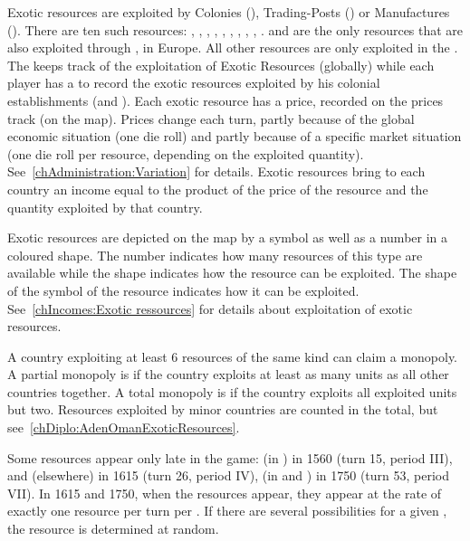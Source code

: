 \label{chThePowers:ResourcesExploitation}
\aparag[Resources] Exotic resources are exploited by Colonies (\COL),
Trading-Posts (\TP) or Manufactures (\MNU). There are ten such resources:
, , , , , , , , , .
\bparag {} and  are the only resources that are also
exploited through \MNU, in Europe. All other resources are only exploited in
the \ROTW.
\bparag The  keeps track of the
exploitation of Exotic Resources (globally) while each player has a
 to record the exotic resources exploited by his
colonial establishments (and \MNU).
\aparag Each exotic resource has a price, recorded on the prices track (on the
\ROTW map).
\bparag Prices change each turn, partly because of the global economic
situation (one die roll) and partly because of a specific market situation
(one die roll per resource, depending on the exploited
quantity). See~\ref{chAdministration:Variation} for details.
\bparag Exotic resources bring to each country an income equal to the product
of the price of the resource and the quantity exploited by that country.

\aparag Exotic resources are depicted on the \ROTW map by a symbol as well as
a number in a coloured shape. The number indicates how many resources of this
type are available while the shape indicates how the resource can be
exploited.
\bparag The shape of the symbol of the resource indicates how it can be
exploited. See~\ref{chIncomes:Exotic ressources} for details about
exploitation of exotic resources.

\label{chThePowers:MonopolyExoticResources}
A country exploiting at least 6 resources of the same kind can claim a
monopoly.
\bparag A partial monopoly is if the country exploits at least as many units
as all other countries together.
\bparag A total monopoly is if the country exploits all exploited units but
two.
\bparag Resources exploited by minor countries are counted in the total, but
see~\ref{chDiplo:AdenOmanExoticResources}.

\label{chThePowers:LateResources} Some
resources appear only late in the game:  (in ) in
1560 (turn 15, period III),  and 
(elsewhere) in 1615 (turn 26, period IV),  (in 
and ) in 1750 (turn 53, period VII).
\bparag In 1615 and 1750, when the resources appear, they appear at the rate
of exactly one resource per turn per \Area. If there are several possibilities
for a given \Area, the resource is determined at random.

